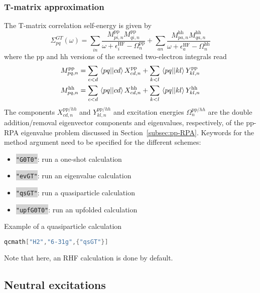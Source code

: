 \documentclass[aip,jcp,reprint,noshowkeys,superscriptaddress]{revtex4-1}
\newcommand{\GT}{\text{$GT$}}
\newcommand{\HF}{\text{HF}}
\newcommand{\pp}{\text{pp}}
\newcommand{\hh}{\text{hh}}
\newcommand{\ep}{\epsilon}
\newcommand{\Sigm}{\Sigma}
\newcommand{\pERI}[2]{\mel{#1}{}{#2}}
\newcommand{\sERI}[2]{M_{#1}^{#2}}
\newcommand{\Ome}{\Omega}
\newcommand{\keyword}[1]{{\colorbox{lightgray}{\texttt{#1}}}}
\begin{document}
\subsubsection*{T-matrix approximation}
The T-matrix correlation self-energy is given by
\begin{equation}
	\Sigm_{pq}^{\GT}(\omega) 
	= \sum_{in} \frac{\sERI{pi,n}{\pp}\sERI{qi,n}{\pp}}{\omega + \ep_{i}^{\HF} - \Ome_{n}^{\pp}}
	+ \sum_{an} \frac{\sERI{pa,n}{\hh}\sERI{qa,n}{\hh}}{\omega + \ep_{a}^{\HF} - \Ome_{n}^{\hh}}
\end{equation}
where the pp and hh versions of the screened two-electron integrals read
\begin{subequations}
\begin{align}
	\sERI{pq,n}{\pp} 
	& = \sum_{c<d} \pERI{pq}{cd} X_{cd,n}^{\pp} 
	+ \sum_{k<l} \pERI{pq}{kl} Y_{kl,n}^{\pp}
	\\
	\sERI{pq,n}{\hh} 
	& = \sum_{c<d} \pERI{pq}{cd} X_{cd,n}^{\hh} 
	+ \sum_{k<l} \pERI{pq}{kl} Y_{kl,n}^{\hh} 
\end{align}
\end{subequations}
The components $X_{cd,n}^{\pp/hh}$ and $Y_{kl,n}^{\pp/hh}$ and excitation energies $\Ome_{n}^{\pp/hh}$ are the double addition/removal eigenvector components and eigenvalues, respectively, of the pp-RPA eigenvalue problem discussed in Section~\ref{subsec:pp-RPA}.
Keywords for the method argument need to be specified for the different schemes: 
\begin{itemize}
\item \keyword{"G0T0"}: run a one-shot calculation
\item \keyword{"evGT"}: run an eigenvalue calculation 
\item \keyword{"qsGT"}: run a quasiparticle calculation 
\item \keyword{"upfG0T0"}: run an upfolded calculation
\end{itemize}
Example of a quasiparticle calculation
\begin{lstlisting}[extendedchars=true,language=Mathematica]
qcmath["H2","6-31g",{"qsGT"}]
\end{lstlisting}
Note that here, an RHF calculation is done by default.

\subsection{Neutral excitations}
\end{document}
